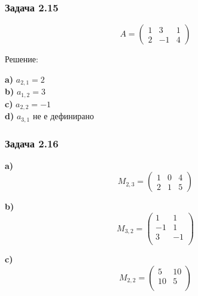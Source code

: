 \documentclass{subfiles}
\begin{document}
\subsubsection{Задача 2.15}

\begin{equation*}
    A = \left(
            \begin{array}{ ccc }
                1 & 3 & 1 \\
                2 & -1 & 4
            \end{array}
        \right)
\end{equation*}

\noindent Решение:

\noindent \textbf{a)} $a_{2,1} = 2$ \\
\noindent \textbf{b)} $a_{1,2} = 3$ \\
\noindent \textbf{c)} $a_{2,2} = -1$ \\
\noindent \textbf{d)} $a_{3,1}$ не е дефинирано \\

\subsubsection{Задача 2.16}

\noindent \textbf{a)}
\begin{equation*}
    M_{2,3} = \left(
        \begin{array}{ ccc }
            1 & 0 & 4 \\
            2 & 1 & 5
        \end{array}
    \right)
\end{equation*}

\noindent \textbf{b)}
\begin{equation*}
    M_{3,2} = \left(
        \begin{array}{ cc }
            1 & 1 \\
            -1 & 1 \\
            3 & -1 \\
        \end{array}
    \right)
\end{equation*}

\noindent \textbf{c)}
\begin{equation*}
    M_{2,2} = \left(
        \begin{array}{ cc }
            5 & 10 \\
            10 & 5 \\
        \end{array}
    \right)
\end{equation*}
\end{document}
